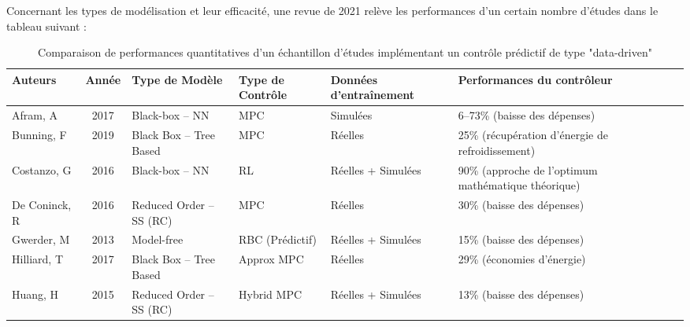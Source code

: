             Concernant les types de modélisation et leur efficacité, une revue de 2021 relève
            les performances d'un certain nombre d'études dans le tableau suivant :

            \begin{table}[H]
                \centering
                \caption{Comparaison de performances quantitatives d'un échantillon d'études
                implémentant un contrôle prédictif de type "data-driven" \cite{KATHIRGAMANATHAN2021110120}}
                \begin{adjustbox}{width=\textwidth}
                    \begin{tabular}{l c l l l l l l}
                        \toprule
                        \textbf{Auteurs} & \textbf{Année} & \textbf{Type de Modèle} &
                        \textbf{Type de Contrôle} & \textbf{Données d'entraînement} &
                        \textbf{Performances du contrôleur} &
                        \\
                        \midrule
                        Afram, A            & 2017 & Black-box -- NN               & MPC             & Simulées          & 6--73\% (baisse des dépenses)                    \\
                        Bunning, F          & 2019 & Black Box -- Tree Based        & MPC             & Réelles                & 25\% (récupération d'énergie de refroidissement)            \\
                        Costanzo, G         & 2016 & Black-box -- NN               & RL              & Réelles + Simulées   & 90\% (approche de l'optimum mathématique théorique)       \\
                        De Coninck, R       & 2016 & Reduced Order -- SS (RC)       & MPC             & Réelles                & 30\% (baisse des dépenses)                      \\
                        Gwerder, M          & 2013 & Model-free                    & RBC (Prédictif) & Réelles + Simulées   & 15\% (baisse des dépenses)                       \\
                        Hilliard, T         & 2017 & Black Box -- Tree Based        & Approx MPC      & Réelles                & 29\% (économies d'énergie)                    \\
                        Huang, H            & 2015 & Reduced Order -- SS (RC)       & Hybrid MPC      & Réelles + Simulées   & 13\% (baisse des dépenses)                      \\

\end{tabular}
\end{adjustbox}
\end{table}
